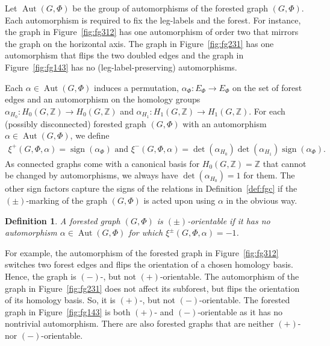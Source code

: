 \documentclass[oneside]{amsart}
\newtheorem{definition}[theorem]{Definition}
\theoremstyle{remark}
\newcommand{\Z}{\mathbb{Z}}
\newcommand{\Aut}{{\operatorname{Aut}}}
\newcommand{\sign}{{\operatorname{sign}}}
\begin{document}

Let $\Aut(G,\Phi)$ be the group of automorphisms of the forested graph $(G,\Phi)$.
Each automorphism is required to fix the leg-labels and the forest.
For instance, the graph in Figure~\ref{fig:fg312} has one automorphism of order two that mirrors the graph on the horizontal axis.
The graph in Figure~\ref{fig:fg231} has one automorphism that flips the two doubled edges 
and the graph in Figure~\ref{fig:fg143} has no (leg-label-preserving) automorphisms.

Each $\alpha \in \Aut(G,\Phi)$ induces a permutation, $\alpha_\Phi:E_\Phi \rightarrow E_\Phi$ on the set of forest edges and an automorphism 
on the homology groups $\alpha_{H_0}: H_0(G,\Z)\rightarrow H_0(G,\Z)$ and $\alpha_{H_1}:H_1(G,\Z)\rightarrow H_1(G,\Z)$.
%
%
%
%
For each (possibly disconnected) forested graph $(G,\Phi)$ with an automorphism $\alpha \in \Aut(G,\Phi)$,
we define 
%
\begin{align*} \xi^+(G,\Phi,\alpha)= \sign(\alpha_\Phi) \text{ and } \xi^-(G,\Phi,\alpha)= \det(\alpha_{H_0}) \det(\alpha_{H_1}) \sign(\alpha_\Phi). \end{align*}
As connected graphs come with a canonical basis for $H_0(G,\Z)= \Z$ that cannot be changed by automorphisms, we always have  $\det(\alpha_{H_0}) = 1$
for them.
The other sign factors capture the signs of the relations in Definition~\ref{def:fgc} if the $(\pm)$-marking of the graph $(G,\Phi)$ is acted upon using $\alpha$ in the obvious way.
\begin{definition}
\label{def:orient}
A forested graph $(G,\Phi)$ is
\emph{$(\pm)$-orientable} if it has no
automorphism $\alpha \in \Aut(G,\Phi)$ for which $\xi^\pm(G,\Phi,\alpha)=-1$.
\end{definition}
For example, the automorphism of the forested graph in Figure~\ref{fig:fg312} 
switches two forest edges and flips the orientation of a chosen homology basis. 
Hence, the graph is $(-)$-, but not $(+)$-orientable.
The automorphism of the graph in Figure~\ref{fig:fg231} does not affect its subforest, but
flips the orientation of its homology basis. So, it is $(+)$-, but not $(-)$-orientable. 
The forested graph in Figure~\ref{fig:fg143} is both $(+)$- and $(-)$-orientable as it has no nontrivial automorphism.
There are also forested graphs that are neither $(+)$- nor $(-)$-orientable. 
%
\end{document}
